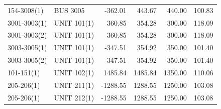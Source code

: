 \documentclass[10pt]{report}
\begin{document}
\begin{table}[H]
{\begin{tabular}{llrrrr}
154-3008(1) & BUS 3005 & -362.01 & 443.67 & 440.00 & 100.83 \\
3001-3003(1) & UNIT 101(1) & 360.85 & 354.28 & 300.00 & 118.09 \\
3001-3003(2) & UNIT 101(1) & 360.85 & 354.28 & 300.00 & 118.09 \\
3003-3005(1) & UNIT 101(1) & -347.51 & 354.92 & 350.00 & 101.40 \\
3003-3005(2) & UNIT 101(1) & -347.51 & 354.92 & 350.00 & 101.40 \\
101-151(1) & UNIT 102(1) & 1485.84 & 1485.84 & 1350.00 & 110.06 \\
205-206(1) & UNIT 211(1) & -1288.55 & 1288.55 & 1250.00 & 103.08 \\
205-206(1) & UNIT 212(1) & -1288.55 & 1288.55 & 1250.00 & 103.08 \\
\bottomrule
\end{tabular}}
\end{table}
\end{document}
